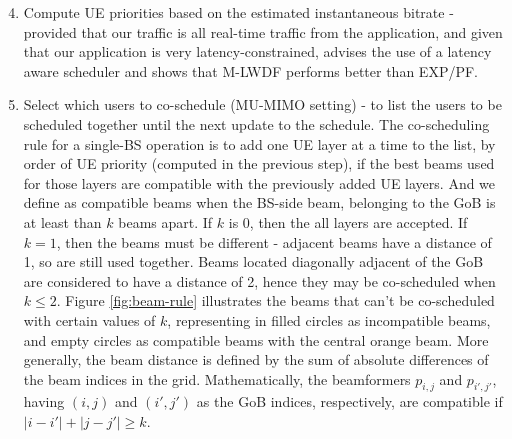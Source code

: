 \begin{enumerate} \setcounter{enumi}{3}
    \item Compute UE priorities based on the estimated instantaneous bitrate - provided that our traffic is all real-time traffic from the application, and given that our application is very latency-constrained, \cite{7020879} advises the use of a latency aware scheduler and shows that \ac{M-LWDF} performs better than \ac{EXP/PF}.
    

    \item Select which users to co-schedule (MU-MIMO setting) - to list the users to be scheduled together until the next update to the schedule. The co-scheduling rule for a single-BS operation is to add one UE layer at a time to the list, by order of \ac{UE} priority (computed in the previous step), if the best beams used for those layers are compatible with the previously added \ac{UE} layers. And we define as compatible beams when the BS-side beam, belonging to the \ac{GoB} is at least than $k$ beams apart. If $k$ is 0, then the all layers are accepted. If $k = 1$, then the beams must be different - adjacent beams have a distance of 1, so are still used together. Beams located diagonally adjacent of the \ac{GoB} are considered to have a distance of 2, hence they may be co-scheduled when $k \leq 2$. Figure \ref{fig:beam-rule} illustrates the beams that can't be co-scheduled with certain values of $k$, representing in filled circles as incompatible beams, and empty circles as compatible beams with the central orange beam. More generally, the beam distance is defined by the sum of absolute differences of the beam indices in the grid. Mathematically, the beamformers $p_{i,j}$ and $p_{i',j'}$, having $(i,j)$ and $(i', j')$ as the GoB indices, respectively, are compatible if $|i-i'| + |j - j'| \geq k$.


\end{enumerate}
    

